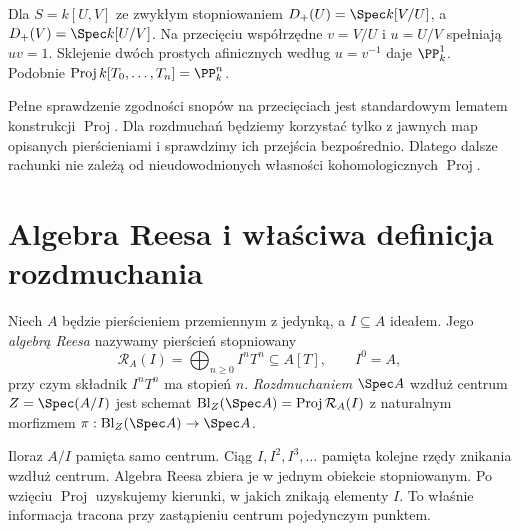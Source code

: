 \begin{przyklad}
Dla $S=k[U,V]$ ze zwykłym stopniowaniem
$D_+(U)=\Spec k[V/U]$, a $D_+(V)=\Spec k[U/V]$.
Na przecięciu współrzędne $v=V/U$ i $u=U/V$
spełniają $uv=1$. Sklejenie dwóch prostych afinicznych
według $u=v^{-1}$ daje $\PP^1_k$.
Podobnie $\operatorname{Proj}k[T_0,\ldots,T_n]=\PP^n_k$.
\end{przyklad}

\begin{uwaga}
Pełne sprawdzenie zgodności snopów na przecięciach jest
standardowym lematem konstrukcji $\operatorname{Proj}$.
Dla rozdmuchań będziemy korzystać tylko z jawnych map
opisanych pierścieniami i sprawdzimy ich przejścia bezpośrednio.
Dlatego dalsze rachunki nie zależą od nieudowodnionych
własności kohomologicznych $\operatorname{Proj}$.
\end{uwaga}

\section{Algebra Reesa i właściwa definicja rozdmuchania}
\label{sec:ga5-rees}

\begin{definicja}
\label{def:ga5-rees}
Niech $A$ będzie pierścieniem przemiennym z jedynką,
a $I\subseteq A$ ideałem. Jego \emph{algebrą Reesa}
nazywamy pierścień stopniowany
\[
 \mathcal R_A(I)=\bigoplus_{n\ge0}I^nT^n\subseteq A[T],
 \qquad I^0=A,
\]
przy czym składnik $I^nT^n$ ma stopień $n$.
\emph{Rozdmuchaniem} $\Spec A$ wzdłuż centrum
$Z=\Spec(A/I)$ jest schemat
$\operatorname{Bl}_Z(\Spec A)=\operatorname{Proj}\mathcal R_A(I)$
z naturalnym morfizmem $\pi:\operatorname{Bl}_Z(\Spec A)\to\Spec A$.
\end{definicja}

\begin{uwaga}
Iloraz $A/I$ pamięta samo centrum. Ciąg
$I,I^2,I^3,\ldots$ pamięta kolejne rzędy znikania
wzdłuż centrum. Algebra Reesa zbiera je w jednym
obiekcie stopniowanym. Po wzięciu $\operatorname{Proj}$
uzyskujemy kierunki, w jakich znikają elementy $I$.
To właśnie informacja tracona przy zastąpieniu
centrum pojedynczym punktem.
\end{uwaga}

